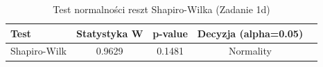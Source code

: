 \begin{table}[H]
\caption{Test normalności reszt Shapiro-Wilka (Zadanie 1d)}
\label{tab:zad1_shapiro}
\begin{tabular}{lcccc}
\toprule
Test & Statystyka W & p-value & Decyzja (alpha=0.05) \\
\midrule
Shapiro-Wilk & 0.9629 & 0.1481 & Normality \\
\bottomrule
\end{tabular}
\end{table}
